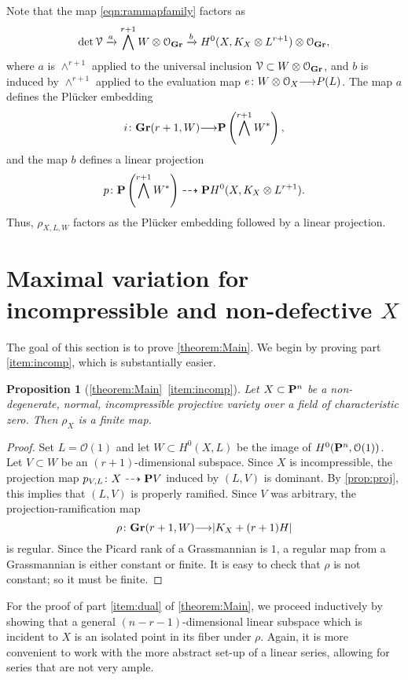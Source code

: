 \documentclass[11pt,reqno]{amsart}
\theoremstyle{plain}
\newtheorem{proposition}[theorem]{Proposition}
\theoremstyle{definition}
\theoremstyle{remark}
\numberwithin{equation}{section}
\renewcommand{\to}{{\longrightarrow}}
\numberwithin{equation}{section}
\renewcommand{\O}{\mathcal O}
\begin{document}
Note that the map \eqref{eqn:rammapfamily} factors as
\[ \det \mathcal V \xrightarrow{a} \bigwedge^{r+1} W \otimes \O_{\Gr} \xrightarrow{b} H^0(X, K_X \otimes L^{r+1}) \otimes \O_{\Gr},\]
where $a$ is $\wedge^{r+1}$ applied to the universal inclusion $\mathcal V \subset W \otimes \O_{\Gr}$, and $b$ is induced by $\wedge^{r+1}$ applied to the evaluation map $e \from W \otimes \O_{X} \to P(L)$.
The map $a$ defines the Pl\"ucker embedding
\[ i \from \Gr(r+1, W) \to \P \left(\bigwedge^{r+1}W^*\right),\]
and the map $b$ defines a linear projection
\[ p \from \P \left(\bigwedge^{r+1}W^*\right) \dashrightarrow \P H^0(X, K_X \otimes L^{r+1}).\]
Thus, $\rho_{X,L,W}$ factors as the Pl\"ucker embedding followed by a linear projection.

\section{Maximal variation for incompressible and non-defective $X$}
\label{sec:proof_of_theorem:main}
The goal of this section is to prove \autoref{theorem:Main}.
We begin by proving part \eqref{item:incomp}, which is substantially easier.
\begin{proposition}[\autoref{theorem:Main}~\eqref{item:incomp}]
  \label{prop:incompress}
  Let $X \subset \P^n$ be a non-degenerate, normal, incompressible projective variety over a field of characteristic zero.
  Then $\rho_X$ is a finite map.
\end{proposition}
\begin{proof}
  Set $L = \O(1)$ and let $W \subset H^0(X, L)$ be the image of $H^0(\P^n, \O(1))$.
  Let $V \subset W$ be an $(r+1)$-dimensional subspace.
  Since $X$ is incompressible, the projection map $p_{V,L} \from X \dashrightarrow \P V$ induced by $(L, V)$ is dominant.
  By \autoref{prop:proj}, this implies that $(L, V)$ is properly ramified.
  Since $V$ was arbitrary, the projection-ramification map 
  \[ \rho \from \Gr(r+1, W) \to |K_X + (r+1) H|\]
  is regular.
  Since the Picard rank of a Grassmannian is $1$, a regular map from a Grassmannian is either constant or finite.
  It is easy to check that $\rho$ is not constant; so it must be finite.
\end{proof}

For the proof of part \eqref{item:dual} of \autoref{theorem:Main}, we proceed inductively by showing that a general $(n-r-1)$-dimensional linear subspace which is incident to $X$ is an isolated point in its fiber under $\rho$.
Again, it is more convenient to work with the more abstract set-up of a linear series, allowing for series that are not very ample.
\end{document}
